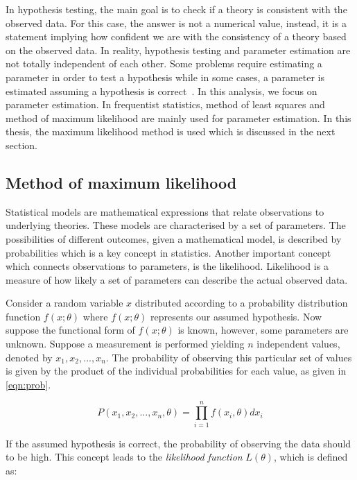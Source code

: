 In hypothesis testing, the main goal is to check if a theory is consistent with the observed data.
For this case, the answer is not a numerical value, instead, it is a statement implying 
how confident we are with the consistency of a theory based on the observed data. In reality,
hypothesis testing and parameter estimation are not totally independent of each other. 
Some problems require estimating a parameter in order to test a hypothesis while in some cases, 
a parameter is estimated assuming a hypothesis is correct~\cite{Lyons_1986}. In this analysis,
we focus on parameter estimation. In frequentist statistics, method of least squares and 
method of maximum likelihood are mainly used for parameter estimation. In this thesis, the maximum likelihood 
method is used which is discussed in the next section. 

\subsection*{Method of maximum likelihood}
\label{sec:maxlike}
Statistical models are mathematical expressions that relate observations to underlying theories.
These models are characterised by a set of parameters. The possibilities of different outcomes, 
given a mathematical model, is described by probabilities which is a key concept in statistics.
Another important concept which connects observations to parameters, is the likelihood.
Likelihood is a measure of how likely a set of parameters can describe the actual observed data. 

Consider a random variable $x$ distributed according to a probability distribution function $f(x;\theta)$
where $f(x;\theta)$ represents our assumed hypothesis. Now suppose the functional form of $f(x;\theta)$ 
is known, however, some parameters are unknown. Suppose a measurement is performed yielding $n$ independent
values, denoted by ${x_1,x_2,...,x_n}$.  The probability of observing this particular set of values 
is given by the product of the individual probabilities for each value, as given in \cref{eqn:prob}. 

\begin{equation}
    P (x_1,x_2,...,x_n,\theta) = \prod_{i=1}^{n} f (x_i,\theta)dx_i
    \label{eqn:prob}
\end{equation}

If the assumed hypothesis is correct, the probability of observing the data should to be high. 
This concept leads to the \textit{likelihood function} $L(\theta)$, which is defined as:

